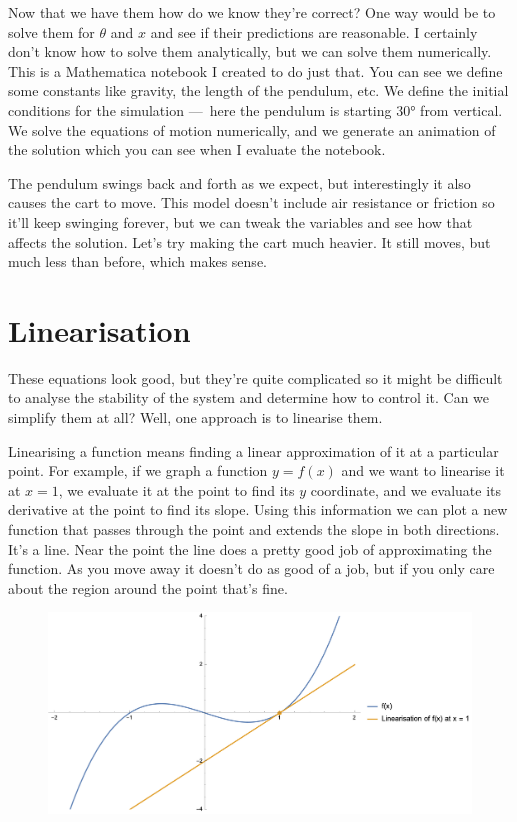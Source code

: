 \documentclass{article}
\begin{document}
Now that we have them how do we know they're correct? One way would be to solve them for $\theta$ and $x$ and see if their predictions are reasonable. I certainly don't know how to solve them analytically, but we can solve them numerically. This is a Mathematica notebook I created to do just that. You can see we define some constants like gravity, the length of the pendulum, etc. We define the initial conditions for the simulation — here the pendulum is starting $\ang{30}$ from vertical. We solve the equations of motion numerically, and we generate an animation of the solution which you can see when I evaluate the notebook.

The pendulum swings back and forth as we expect, but interestingly it also causes the cart to move. This model doesn't include air resistance or friction so it'll keep swinging forever, but we can tweak the variables and see how that affects the solution. Let's try making the cart much heavier. It still moves, but much less than before, which makes sense.

\section{Linearisation}

These equations look good, but they're quite complicated so it might be difficult to analyse the stability of the system and determine how to control it. Can we simplify them at all? Well, one approach is to linearise them.

Linearising a function means finding a linear approximation of it at a particular point. For example, if we graph a function $y = f(x)$ and we want to linearise it at $x = 1$, we evaluate it at the point to find its $y$ coordinate, and we evaluate its derivative at the point to find its slope. Using this information we can plot a new function that passes through the point and extends the slope in both directions. It's a line. Near the point the line does a pretty good job of approximating the function. As you move away it doesn't do as good of a job, but if you only care about the region around the point that's fine.

\begin{figure}[H]
  \centering
\includegraphics[width=\textwidth]{linearisation}
\end{figure}
\end{document}
